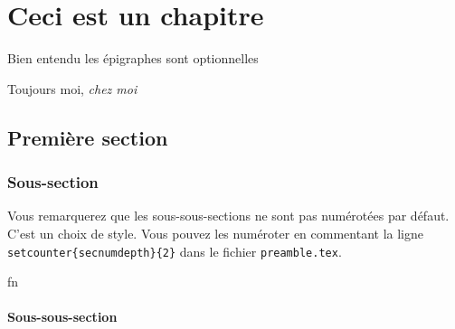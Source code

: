 \chapter{Ceci est un chapitre}

\epigraph{Bien entendu les épigraphes sont optionnelles}{Toujours moi, \textit{chez moi}}

\section{Première section}


\subsection{Sous-section}
Vous remarquerez que les sous-sous-sections ne sont pas numérotées par défaut. C'est un choix de style. Vous pouvez les numéroter en commentant la ligne \texttt{\\setcounter\{secnumdepth\}\{2\}} dans le fichier \texttt{preamble.tex}.

\gls{fn}

\subsubsection{Sous-sous-section}
\lipsum[1-8]
